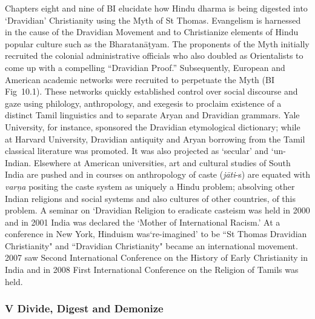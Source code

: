 Chapters eight and nine of BI elucidate how Hindu dharma is being digested into ‘Dravidian’ Christianity using the Myth of St Thomas. Evangelism is harnessed in the cause of the Dravidian Movement and to Christianize elements of Hindu popular culture such as the Bharatanāṭyam. The proponents of the Myth initially recruited the colonial administrative officials who also doubled as Orientalists to come up with a compelling “Dravidian Proof.” Subsequently, European and American academic networks were recruited to perpetuate the Myth (BI Fig~10.1). These networks quickly established control over social discourse and gaze using philology, anthropology, and exegesis to proclaim existence of a distinct Tamil linguistics and to separate Aryan and Dravidian grammars. Yale University, for instance, sponsored the Dravidian etymological dictionary; while at Harvard University, Dravidian antiquity and Aryan borrowing from the Tamil classical literature was promoted. It was also projected as ‘secular’ and ‘un-Indian. Elsewhere at American universities, art and cultural studies of South India are pushed and in courses on anthropology of caste (\textit{jāti}-s) are equated with \textit{varņa} positing the caste system as uniquely a Hindu problem; absolving other Indian religions and social systems and also cultures of other countries, of this problem. A seminar on ‘Dravidian Religion to eradicate casteism was held in 2000 and in 2001 India was declared the ‘Mother of International Racism.’ At a conference in New York, Hinduism was‘re-imagined’ to be ``St Thomas Dravidian Christianity" and ``Dravidian Christianity" became an international movement. 2007 saw Second International Conference on the History of Early Christianity in India and in 2008 First International Conference on the Religion of Tamils was held.

\newpage


\subsubsection*{V Divide, Digest and Demonize}

\vskip -6pt


